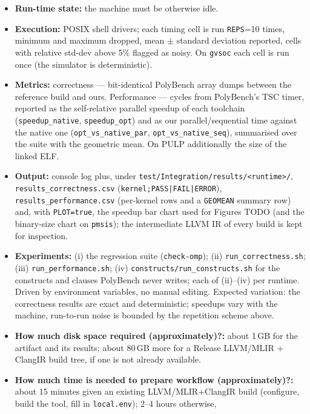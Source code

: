{\begin{itemize}
  \item {\bf Run-time state: } the machine must be otherwise idle.
  \item {\bf Execution: } POSIX shell drivers; each timing cell is run
    \texttt{REPS}=10 times, minimum and maximum dropped, mean $\pm$ standard
    deviation reported, cells with relative std-dev above 5\% flagged as noisy.
    On \texttt{gvsoc} each cell is run once (the simulator is deterministic).
  \item {\bf Metrics: } correctness --- bit-identical PolyBench array dumps
    between the reference build and ours.  Performance --- cycles from
    PolyBench's TSC timer, reported as the self-relative parallel speedup of
    each toolchain (\texttt{speedup\_native}, \texttt{speedup\_opt}) and as our
    parallel/sequential time against the native one
    (\texttt{opt\_vs\_native\_par}, \texttt{opt\_vs\_native\_seq}), summarised
    over the suite with the geometric mean.  On PULP additionally the size of
    the linked ELF.
  \item {\bf Output: } console log plus, under
    \texttt{test/Integration/results/<runtime>/},
    \texttt{results\_correctness.csv} (\texttt{kernel;PASS|FAIL|ERROR}),
    \texttt{results\_performance.csv} (per-kernel rows and a \texttt{GEOMEAN}
    summary row) and, with \texttt{PLOT=true}, the speedup bar chart used for
    Figures TODO (and the binary-size chart on \texttt{pmsis}); the intermediate
    LLVM IR of every build is kept for inspection.
  \item {\bf Experiments: } (i) the regression suite (\texttt{check-omp});
    (ii) \texttt{run\_correctness.sh}; (iii) \texttt{run\_performance.sh};
    (iv) \texttt{constructs/run\_constructs.sh} for the constructs and clauses
    PolyBench never writes; each of (ii)--(iv)
    per runtime.  Driven by environment variables, no manual editing.
    Expected variation: the correctness results are exact and deterministic;
    speedups vary with the machine, run-to-run noise is bounded by the
    repetition scheme above.
  \item {\bf How much disk space required (approximately)?: } about 1\,GB for
    the artifact and its results; about 80\,GB more for a Release LLVM/MLIR +
    ClangIR build tree, if one is not already available.
  \item {\bf How much time is needed to prepare workflow (approximately)?: }
    about 15 minutes given an existing LLVM/MLIR+ClangIR build (configure,
    build the tool, fill in \texttt{local.env}); 2--4 hours otherwise,

\end{itemize}}

